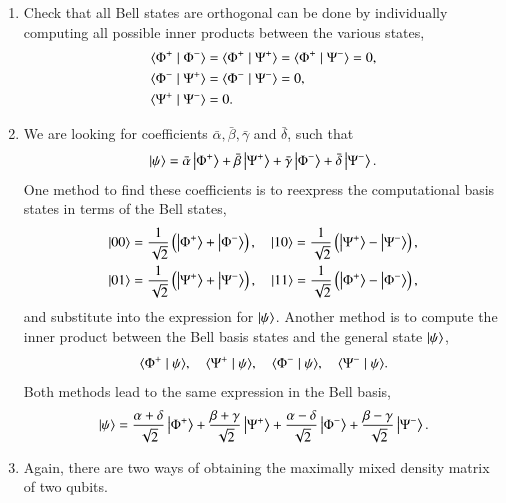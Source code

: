 \begin{solution}
\begin{enumerate}[label=(\alph*)]
    \item Check that all Bell states are orthogonal can be done by individually computing all possible inner products between the various states,
    \begin{align*}
        \langle \Phi^+ \mid \Phi^- \rangle & = \langle \Phi^+ \mid \Psi^+ \rangle = \langle \Phi^+ \mid \Psi^- \rangle = 0, \\
        \langle \Phi^- \mid \Psi^+ \rangle & = \langle \Phi^- \mid \Psi^- \rangle = 0, \\
        \langle \Psi^+ \mid \Psi^- \rangle & = 0.
    \end{align*}
    \item We are looking for coefficients $\bar{\alpha}, \bar{\beta}, \bar{\gamma}$ and $\bar{\delta}$, such that
    \begin{equation*}
        \left| \psi \right\rangle = \bar{\alpha}\left| \Phi^+ \right\rangle + \bar{\beta}\left| \Psi^+ \right\rangle + \bar{\gamma}\left| \Phi^- \right\rangle + \bar{\delta}\left| \Psi^- \right\rangle.
    \end{equation*}
    One method to find these coefficients is to reexpress the computational basis states in terms of the Bell states,
    \begin{align*}
        \ket{00} & = \frac{1}{\sqrt{2}}\left(\ket{\Phi^+}+\ket{\Phi^-}\right), \quad \ket{10} = \frac{1}{\sqrt{2}}\left(\ket{\Psi^+}-\ket{\Psi^-}\right), \\
        \ket{01} & = \frac{1}{\sqrt{2}}\left(\ket{\Psi^+}+\ket{\Psi^-}\right), \quad \ket{11} = \frac{1}{\sqrt{2}}\left(\ket{\Phi^+}-\ket{\Phi^-}\right),
    \end{align*}
    and substitute into the expression for $\left| \psi \right\rangle$.
    Another method is to compute the inner product between the Bell basis states and the general state $\left| \psi \right\rangle$,
    \begin{equation*}
        \innp{\Phi^+}{\psi}, \quad \innp{\Psi^+}{\psi}, \quad \innp{\Phi^-}{\psi}, \quad \innp{\Psi^-}{\psi}.
    \end{equation*}
    Both methods lead to the same expression in the Bell basis,
    \begin{equation*}
        \left| \psi \right\rangle = \frac{\alpha+\delta}{\sqrt{2}}\left| \Phi^+ \right\rangle + \frac{\beta+\gamma}{\sqrt{2}}\left| \Psi^+ \right\rangle + \frac{\alpha-\delta}{\sqrt{2}}\left| \Phi^- \right\rangle + \frac{\beta-\gamma}{\sqrt{2}}\left| \Psi^- \right\rangle.
    \end{equation*}
    \item Again, there are two ways of obtaining the maximally mixed density matrix of two qubits.

\end{enumerate}
\end{solution}
